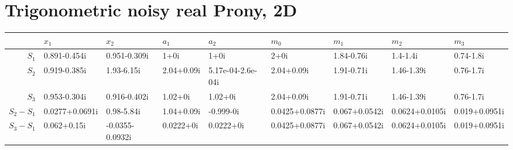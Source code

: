 \section{Trigonometric noisy real Prony, 2D}

\begin{table}
\centering
\begin{tabular}{rllllllll}
  \hline
 & $x_1$ & $x_2$ & $a_1$ & $a_2$ & $m_0$ & $m_1$ & $m_2$ & $m_3$ \\ 
  \hline
  $S_1$ & 0.891-0.454i & 0.951-0.309i & 1+0i & 1+0i & 2+0i & 1.84-0.76i & 1.4-1.4i & 0.74-1.8i \\ 
  $S_2$ & 0.919-0.385i & 1.93-6.15i & 2.04+0.09i & 5.17e-04-2.6e-04i & 2.04+0.09i & 1.91-0.71i & 1.46-1.39i & 0.76-1.7i \\ 
  $S_3$ & 0.953-0.304i & 0.916-0.402i & 1.02+0i & 1.02+0i & 2.04+0.09i & 1.91-0.71i & 1.46-1.39i & 0.76-1.7i \\ 
  $S_2-S_1$ & 0.0277+0.0691i & 0.98-5.84i & 1.04+0.09i & -0.999-0i & 0.0425+0.0877i & 0.067+0.0542i & 0.0624+0.0105i & 0.019+0.0951i \\ 
  $S_3-S_1$ & 0.062+0.15i & -0.0355-0.0932i & 0.0222+0i & 0.0222+0i & 0.0425+0.0877i & 0.067+0.0542i & 0.0624+0.0105i & 0.019+0.0951i \\ 
   \hline
\end{tabular}
\end{table}
  
  
  
  
